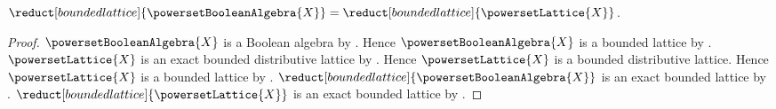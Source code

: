 \begin{theorem}\label{powerset_boolean_algebra_bounded_lattice_reduct}
    $\reduct[bounded lattice]{\powersetBooleanAlgebra{X}}
        =\reduct[bounded lattice]{\powersetLattice{X}}$.
\end{theorem}
\begin{proof}
    $\powersetBooleanAlgebra{X}$ is a Boolean algebra by
        .
    Hence $\powersetBooleanAlgebra{X}$ is a bounded lattice by
        .
    $\powersetLattice{X}$ is an exact bounded distributive lattice by
        .
    Hence $\powersetLattice{X}$ is a bounded distributive lattice.
    Hence $\powersetLattice{X}$ is a bounded lattice by
        .
    $\reduct[bounded lattice]{\powersetBooleanAlgebra{X}}$
        is an exact bounded lattice by
        .
    $\reduct[bounded lattice]{\powersetLattice{X}}$
        is an exact bounded lattice by
        .


\end{proof}
